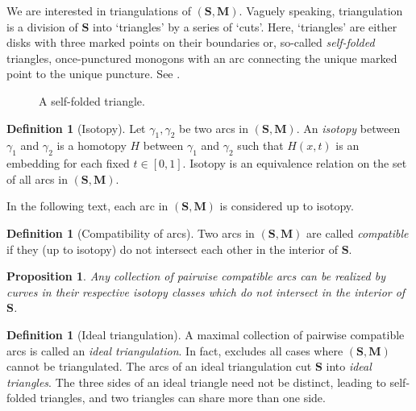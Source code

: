 \documentclass[a4paper,oneside,svgnames]{amsart}
\theoremstyle{plain}
\newtheorem{proposition}[theorem]{Proposition}
\theoremstyle{definition}
\newtheorem{definition}[theorem]{Definition}
\begin{document}
 We are interested in triangulations of $(\mathbf{S},\mathbf{M})$. Vaguely
 speaking, triangulation is a division of $\mathbf{S}$ into `triangles' by a
 series of `cuts'. Here, `triangles' are either disks with three marked points
 on their boundaries or, so-called \emph{self-folded} triangles, once-punctured
 monogons with an arc connecting the unique marked point to the unique puncture.
 See .
 \begin{figure}[ht]
  \centering

  \caption{A self-folded triangle.}
  \label{fig:self-folded-triangle}
 \end{figure}

 \begin{definition}[Isotopy]
  \label{def:isotopy}
  Let $\gamma_1,\gamma_2$ be two arcs in $(\mathbf{S},\mathbf{M})$. An
  \emph{isotopy} between $\gamma_1$ and $\gamma_2$ is a homotopy $H$ between
  $\gamma_1$ and $\gamma_2$ such that $H(x,t)$ is an embedding for each fixed
  $t \in [0,1]$. Isotopy is an equivalence relation on the set of all arcs in
  $(\mathbf{S},\mathbf{M})$.
 \end{definition}
 In the following text, each arc in $(\mathbf{S},\mathbf{M})$ is considered up
 to isotopy.

 \begin{definition}[Compatibility of arcs]
  \label{def:compatibility-of-arcs}
  Two arcs in $(\mathbf{S},\mathbf{M})$ are called \emph{compatible} if they (up
  to isotopy) do not intersect each other in the interior of $\mathbf{S}$.
 \end{definition}

 \begin{proposition}
  \label{prop:triangulation-up-to-isotopy}
  Any collection of pairwise compatible arcs can be realized by curves in their
  respective isotopy classes which do not intersect in the interior of
  $\mathbf{S}$.
 \end{proposition}

 \begin{definition}[Ideal triangulation]
  \label{def:ideal-triangulation}
  A maximal collection of pairwise compatible arcs is called an \emph{ideal
  triangulation}. In fact,  excludes all cases where
  $(\mathbf{S},\mathbf{M})$ cannot be triangulated. The arcs of an ideal
  triangulation cut $\mathbf{S}$ into \emph{ideal triangles}. The three sides of
  an ideal triangle need not be distinct, leading to self-folded triangles, and
  two triangles can share more than one side.
 \end{definition}
\end{document}
